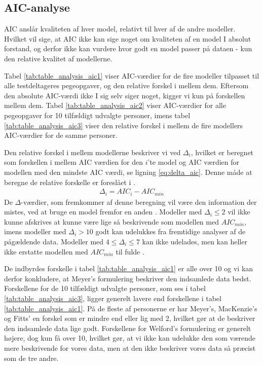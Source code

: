 \subsection*{AIC-analyse}
AIC anslår kvaliteten af hver model, relativt til hver af de andre modeller. Hvilket vil sige, at AIC ikke kan sige noget om kvaliteten af en model I absolut forstand, og derfor ikke kan vurdere hvor godt en model passer på dataen - kun den relative kvalitet af modellerne.

Tabel \ref{tab:table_analysis_aic1} viser AIC-værdier for de fire modeller tilpasset til alle testdeltageres pegeopgaver, og den relative forskel i mellem dem. Eftersom den absolute AIC-værdi ikke I sig selv siger noget, kigger vi kun på forskellen mellem dem. Tabel \ref{tab:table_analysis_aic2} viser AIC-værdier for alle pegeopgaver for 10 tilfældigt udvalgte personer, imens tabel \ref{tab:table_analysis_aic3} viser den relative forskel i mellem de fire modellers AIC-værdier for de samme personer.

Den relative forskel i mellem modellerne beskriver vi ved $\Delta_i$, hvilket er beregnet som forskellen i mellem AIC værdien for den $i$'te model og AIC værdien for modellen med den mindste AIC værdi, se ligning \ref{eq:delta_aic}. Denne måde at beregne de relative forskelle er foreslået i \cite{burnham2004}.
\begin{align}
\Delta_i = AIC_i - AIC_{min}
\label{eq:delta_aic}
\end{align} 
De $\Delta$-værdier, som fremkommer af denne beregning vil være den information der mistes, ved at bruge en model fremfor en anden \cite{burnham2004}. Modeller med $\Delta_i \leq 2$ vil ikke kunne afskrives at kunne være lige så beskrivende som modellen med $AIC_{min}$, imens modeller med $\Delta_i > 10$ godt kan udelukkes fra fremtidige analyser af de pågældende data. Modeller med $4 \leq \Delta_i \leq 7$ kan ikke udelades, men kan heller ikke erstatte modellen med $AIC_{min}$ til fulde \cite{burnham2004}.

De indbyrdes forskelle i tabel \ref{tab:table_analysis_aic1} er alle over 10 og vi kan derfor konkludere, at Meyer's formulering beskriver den indsamlede data bedst. Forskellene for de 10 tilfældigt udvalgte personer, som ses i tabel \ref{tab:table_analysis_aic3}, ligger generelt lavere end forskellene i tabel \ref{tab:table_analysis_aic1}. På de fleste af personerne er har Meyer's, MacKenzie's og Fitts' en forskel som er mindre end eller lig med 2, hvilket gør at de beskriver den indsamlede data lige godt. Forskellene for Welford's formulering er generelt højere, dog kun få over 10, hvilket gør, at vi ikke kan udelukke den som værende mere beskrivende for vores data, men at den ikke beskriver vores data så præcist som de tre andre. 

